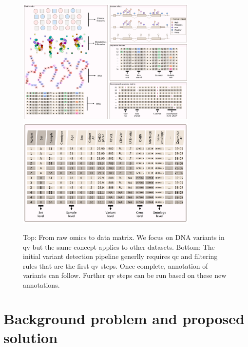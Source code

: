 \begin{figure}[h!]
    \centering
   \includegraphics[width=0.8\textwidth]{./images/candidate_variants_sequence_to_matrix_pink.pdf}
      \includegraphics[width=0.8\textwidth]{./images/candidate_variants_sequence_annotation_pink.pdf}
    \caption{Top: From raw omics to data matrix.  We focus on DNA variants in \ac{qv} but the same concept applies to other datasets.
    Bottom: The initial variant detection pipeline generlly requires \ac{qc} and filtering rules that are the first \ac{qv} steps. Once complete, annotation of variants can follow. Further \ac{qv} steps can be run based on these new annotations.}
        \label{fig:candidate_variants_sequence_annotation}
\end{figure}

\section{Background problem and proposed solution}

